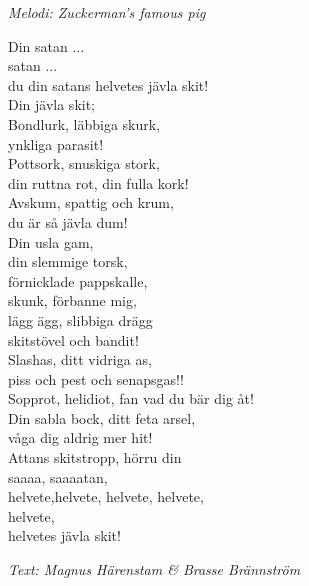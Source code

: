 {\footnotesize\textit{Melodi: Zuckerman's famous pig}}\par
\vspace{10pt}
Din satan ...\\
satan ...\\
du din satans helvetes jävla skit!\\
Din jävla skit;\\
Bondlurk, läbbiga skurk,\\
ynkliga parasit!\\
Pottsork, snuskiga stork,\\
din ruttna rot, din fulla kork!\\
Avskum, spattig och krum, \\
du är så jävla dum!\\
Din usla gam,\\
din slemmige torsk,\\
förnicklade pappskalle,\\
skunk, förbanne mig,\\
lägg ägg, slibbiga drägg\\
skitstövel och bandit!\\
Slashas, ditt vidriga as,\\
piss och pest och senapsgas!!\\
Sopprot, helidiot, fan vad du bär dig åt!\\
Din sabla bock, ditt feta arsel,\\
våga dig aldrig mer hit!\\
Attans skitstropp, hörru din\\
saaaa, saaaatan,\\
helvete,helvete, helvete, helvete,\\
helvete,\\
helvetes jävla skit!\par
\vspace{10pt}
{\footnotesize\textit{Text: Magnus Härenstam \& Brasse Brännström}}
